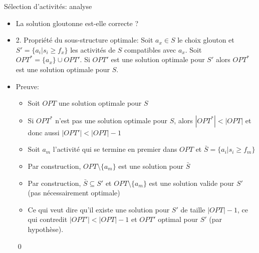 \begin{frame}{Sélection d'activités: analyse}
\begin{itemize}
\item La solution gloutonne est-elle correcte ?

\bigskip

\item \alert{2. Propriété du sous-structure optimale:} Soit $a_x\in S$ le choix glouton et $S'=\{a_i|s_i\geq f_x\}$ les activités de $S$ compatibles avec $a_x$. Soit $OPT^*=\{a_x\}\cup OPT'$. Si $OPT'$ est une solution optimale pour $S'$ alors $OPT^*$ est une solution optimale pour $S$.
\item \alert{Preuve:}
\begin{itemize}
\item Soit $OPT$ une solution optimale pour $S$
\item Si $OPT^*$ n'est pas une solution optimale pour $S$, alors $|OPT^*|<|OPT|$ et donc aussi $|OPT'|<|OPT|-1$
\item Soit $a_m$ l'activité qui se termine en premier dans $OPT$ et $\bar{S}=\{a_i|s_i\geq f_m\}$
\item Par construction, $OPT\setminus\{a_m\}$ est une solution pour $\bar{S}$
\item Par construction, $\bar{S}\subseteq S'$ et $OPT\setminus\{a_m\}$
  est une solution valide pour $S'$ (pas nécessairement optimale)
\item Ce qui veut dire qu'il existe une solution pour $S'$ de taille $|OPT|-1$, ce qui contredit  $|OPT'|<|OPT|-1$ et $OPT'$ optimal pour $S'$ (par hypothèse).
\end{itemize}\qed
\end{itemize}

\end{frame}

